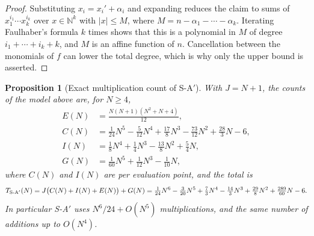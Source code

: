 \documentclass[11pt,reqno]{amsart}
\newtheorem{proposition}[theorem]{Proposition}
\theoremstyle{definition}
\theoremstyle{remark}
\newcommand{\N}{\mathbb N}
\begin{document}
\begin{proof}
Substituting $x_i=x_i'+\alpha_i$ and expanding reduces the claim to
sums of $x_1^{i_1}\cdots x_k^{i_k}$ over $x\in\N^k$ with $|x|\leq M$, where
$M=n-\alpha_1-\cdots-\alpha_k$.  Iterating Faulhaber's formula $k$ times
shows that this is a polynomial in $M$ of degree $i_1+\cdots+i_k+k$, and $M$
is an affine function of $n$.  Cancellation between the monomials of $f$ can
lower the total degree, which is why only the upper bound is asserted.
\end{proof}

\begin{proposition}[Exact multiplication count of S-A$'$]\label{prop:sa-count}
With $J=N+1$, the counts of the model above are, for $N\geq4$,
\begin{align}
 E(N)&=\tfrac{N(N+1)(N^2+N+4)}{12},\label{eq:countE}\\
 C(N)&=\tfrac1{24}N^5-\tfrac5{12}N^4+\tfrac{17}8N^3-\tfrac{73}{12}N^2
      +\tfrac{28}3N-6,\label{eq:countC}\\
 I(N)&=\tfrac18N^4+\tfrac14N^3-\tfrac{13}8N^2+\tfrac54N,\label{eq:countI}\\
 G(N)&=\tfrac1{60}N^5+\tfrac1{12}N^3-\tfrac1{10}N,\label{eq:countG}
\end{align}
where $C(N)$ and $I(N)$ are per evaluation point, and the total is
\begin{equation}\label{eq:sa-total}
 T_{\mathrm{S\text-A}'}(N)=J\bigl(C(N)+I(N)+E(N)\bigr)+G(N)
 =\tfrac{1}{24}N^6-\tfrac3{20}N^5+\tfrac73N^4-\tfrac{14}3N^3
 +\tfrac{29}8N^2+\tfrac{289}{60}N-6 .
\end{equation}
In particular S-A$'$ uses $N^6/24+O(N^5)$ multiplications, and the same
number of additions up to $O(N^4)$.
\end{proposition}
\end{document}
